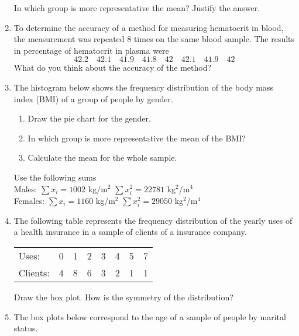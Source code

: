 \begin{enumerate}[leftmargin=*]
In which group is more representative the mean? Justify the answer.

\item To determine the accuracy of a method for measuring hematocrit in blood, the measurement was repeated 8 times on
the same blood sample.
The results in percentage of hematocrit in plasma were
\[
42.2\quad 42.1\quad 41.9\quad 41.8\quad 42\quad 42.1\quad 41.9\quad 42
\]
What do you think about the accuracy of the method?


\item The histogram below shows the frequency distribution of the body mass index (BMI) of a group of people by gender.
\begin{center}
\resizebox{0.6\textwidth}{!}{}
\end{center} 

\begin{enumerate}
\item Draw the pie chart for the gender.
\item In which group is more representative the mean of the BMI?
\item Calculate the mean for the whole sample.
\end{enumerate}
Use the following sums\\
Males: $\sum x_i=1002$ kg/m$^2$ \quad $\sum x_i^2 = 22781$ kg$^2$/m$^4$ \\
Females: $\sum x_i=1160$ kg/m$^2$ \quad $\sum x_i^2 = 29050$ kg$^2$/m$^4$ 

\item The following table represents the frequency distribution of the yearly uses of a health insurance in a sample of
clients of a insurance company.

\begin{center}
\begin{tabular}{lrrrrrrr}
\toprule
Uses: & 0 & 1 & 2 & 3 & 4 & 5 & 7 \\
Clients: & 4 & 8 & 6 & 3 & 2 & 1 & 1\\
\bottomrule
\end{tabular}
\end{center}

Draw the box plot. How is the symmetry of the distribution?


\item The box plots below correspond to the age of a sample of people by marital status.
\begin{center}
\resizebox{0.6\textwidth}{!}{}
\end{center} 


\end{enumerate}
